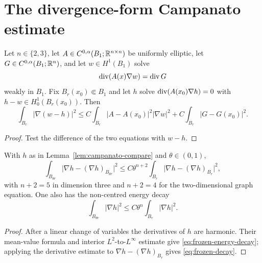 \section{The divergence-form Campanato estimate}\label{sec:campanato}

\begin{lemma}\label{lem:campanato-compare}
Let $n\in\{2,3\}$, let
$A\in C^{0,\alpha}(B_1;\mathbb R^{n\times n})$ be uniformly elliptic, let
$G\in C^{0,\alpha}(B_1;\mathbb R^n)$, and let $w\in H^1(B_1)$ solve
\begin{equation}\label{eq:div-form}
  \operatorname{div}(A(x)\nabla w)=\operatorname{div} G
\end{equation}
weakly in $B_1$.  Fix $B_r(x_0)\Subset B_1$ and let $h$ solve
$\operatorname{div}(A(x_0)\nabla h)=0$ with $h-w\in H^1_0(B_r(x_0))$.  Then
\begin{equation}\label{eq:campanato-compare}
  \int_{B_r}|\nabla(w-h)|^2
  \le C\int_{B_r}|A-A(x_0)|^2|\nabla w|^2
   +C\int_{B_r}|G-G(x_0)|^2 .
\end{equation}
\end{lemma}

\begin{proof}
Test the difference of the two equations with $w-h$.
\end{proof}

\begin{lemma}\label{lem:frozen-decay}
With $h$ as in Lemma~\ref{lem:campanato-compare} and $\theta\in(0,1)$,
\begin{equation}\label{eq:frozen-decay}
  \int_{B_{\theta r}}\bigl|\nabla h-(\nabla h)_{B_{\theta r}}\bigr|^2
  \le C\theta^{n+2}\int_{B_r}\bigl|\nabla h-(\nabla h)_{B_r}\bigr|^2 ,
\end{equation}
with $n+2=5$ in dimension three and $n+2=4$ for the two-dimensional graph
equation.  One also has the non-centred energy decay
\begin{equation}\label{eq:frozen-energy-decay}
  \int_{B_{\theta r}}|\nabla h|^2
  \le C\theta^n\int_{B_r}|\nabla h|^2 .
\end{equation}
\end{lemma}

\begin{proof}
After a linear change of variables the derivatives of $h$ are harmonic.
Their mean-value formula and interior $L^2$-to-$L^\infty$ estimate give
\eqref{eq:frozen-energy-decay}; applying the derivative estimate to
$\nabla h-(\nabla h)_{B_r}$ gives \eqref{eq:frozen-decay}.
\end{proof}

